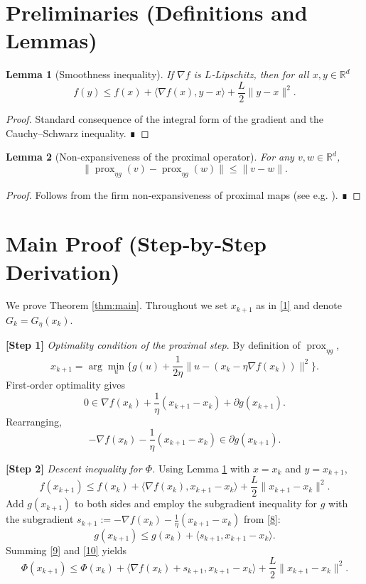 \documentclass{article}
\newtheorem{lemma}{Lemma}
\begin{document}
\newpage
\section*{Preliminaries (Definitions and Lemmas)}
\begin{lemma}[Smoothness inequality]\label{lem:smooth}
If $\nabla f$ is $L$‑Lipschitz, then for all $x,y\in\mathbb{R}^{d}$
\[
f(y)\le f(x)+\langle\nabla f(x),y-x\rangle+\frac{L}{2}\|y-x\|^{2}.
\tag{5}
\]
\end{lemma}
\begin{proof}
Standard consequence of the integral form of the gradient and the Cauchy–Schwarz inequality. ∎
\end{proof}
\begin{lemma}[Non‑expansiveness of the proximal operator]\label{lem:nonexp}
For any $v,w\in\mathbb{R}^{d}$,
\[
\big\|\operatorname{prox}_{\eta g}(v)-\operatorname{prox}_{\eta g}(w)\big\|
\le\|v-w\|.
\tag{6}
\]
\end{lemma}
\begin{proof}
Follows from the firm non‑expansiveness of proximal maps (see e.g. \cite{Parikh2014}). ∎
\end{proof}

\section*{Main Proof (Step‑by‑Step Derivation)}
We prove Theorem \ref{thm:main}.  Throughout we set $x_{k+1}$ as in \eqref{1} and denote $G_{k}=G_{\eta}(x_{k})$.

\noindent\textbf{[Step 1]}  \emph{Optimality condition of the proximal step}.  
By definition of $\operatorname{prox}_{\eta g}$,
\[
x_{k+1}
=\arg\min_{u}\Big\{g(u)+\frac{1}{2\eta}\|u-(x_{k}-\eta\nabla f(x_{k}))\|^{2}\Big\}.
\]
First‑order optimality gives
\[
0\in\nabla f(x_{k})+\frac{1}{\eta}(x_{k+1}-x_{k})+\partial g(x_{k+1}).
\tag{7}
\]
Rearranging,
\[
-\nabla f(x_{k})-\frac{1}{\eta}(x_{k+1}-x_{k})\in\partial g(x_{k+1}).
\tag{8}
\]

\noindent\textbf{[Step 2]}  \emph{Descent inequality for $\Phi$.}  
Using Lemma \ref{lem:smooth} with $x=x_{k}$ and $y=x_{k+1}$,
\[
f(x_{k+1})\le f(x_{k})+\langle\nabla f(x_{k}),x_{k+1}-x_{k}\rangle
+\frac{L}{2}\|x_{k+1}-x_{k}\|^{2}.
\tag{9}
\]
Add $g(x_{k+1})$ to both sides and employ the subgradient inequality for $g$ with the subgradient $s_{k+1}:=-\nabla f(x_{k})-\frac{1}{\eta}(x_{k+1}-x_{k})$ from \eqref{8}:
\[
g(x_{k+1})\le g(x_{k})+\langle s_{k+1},x_{k+1}-x_{k}\rangle.
\tag{10}
\]
Summing \eqref{9} and \eqref{10} yields
\[
\Phi(x_{k+1})
\le \Phi(x_{k})
+\langle\nabla f(x_{k})+s_{k+1},x_{k+1}-x_{k}\rangle
+\frac{L}{2}\|x_{k+1}-x_{k}\|^{2}.
\tag{11}
\]
\end{document}

